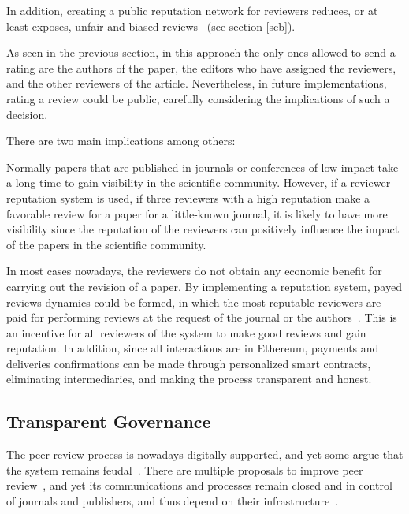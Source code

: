 In addition, creating a public reputation network for reviewers reduces, or at
least exposes, unfair and biased
reviews~\cite{wenneras2001nepotism,ReinventingSocioTech} (see section
\ref{scb}).

As seen in the previous section, in this approach the only ones allowed to send
a rating are the authors of the paper, the editors who have assigned the
reviewers, and the other reviewers of the article. Nevertheless, in future
implementations, rating a review could be public, carefully considering the
implications of such a decision.

There are two main implications among others:

\begin{itemize}
   Normally papers
  that are published in journals or conferences of low impact take a long time
  to gain visibility in the scientific community. However, if a reviewer
  reputation system is used, if three reviewers with a high reputation make a
  favorable review for a paper for a little-known journal, it is likely to have
  more visibility since the reputation of the reviewers can positively influence
  the impact of the papers in the scientific community.
  
   In most cases nowadays, the reviewers do not obtain any
  economic benefit for carrying out the revision of a paper. By implementing a
  reputation system, payed reviews dynamics could be formed, in which the most
  reputable reviewers are paid for performing reviews at the request of the
  journal or the authors~\cite{Jan:2018:SDC:3184558.3191556}. This is an
  incentive for all reviewers of the system to make good reviews and gain
  reputation. In addition, since all interactions are in Ethereum, payments and
  deliveries confirmations can be made through personalized smart contracts,
  eliminating intermediaries, and making the process transparent and honest.
 
\end{itemize}

\subsection{Transparent Governance}
\label{sec:transp-govern}

The peer review process is nowadays digitally supported, and yet some argue that
the system remains feudal~\cite{ReinventingRigor}. There are multiple proposals
to improve peer review~\cite{walker_emerging_2015}, and yet its communications
and processes remain closed and in control of journals and publishers, and thus
depend on their infrastructure~\cite{ReinventingSocioTech}.

